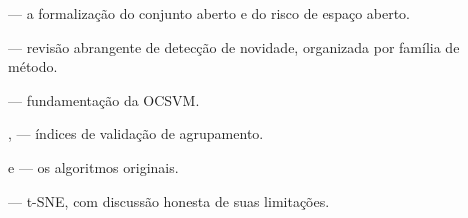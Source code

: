 \begin{leituras}
\item \citet{Scheirer2013} --- a formalização do conjunto aberto e do risco de espaço
      aberto.
\item \citet{Pimentel2014review} --- revisão abrangente de detecção de novidade,
      organizada por família de método.
\item \citet{Smola2004} --- fundamentação da OCSVM.
\item \citet{Rousseeuw1987}, \citet{Calinski1974} --- índices de validação de
      agrupamento.
\item \citet{dbscan} e \citet{meanshift} --- os algoritmos originais.
\item \citet{maaten2008visualizing} --- t-SNE, com discussão honesta de suas limitações.
\end{leituras}
